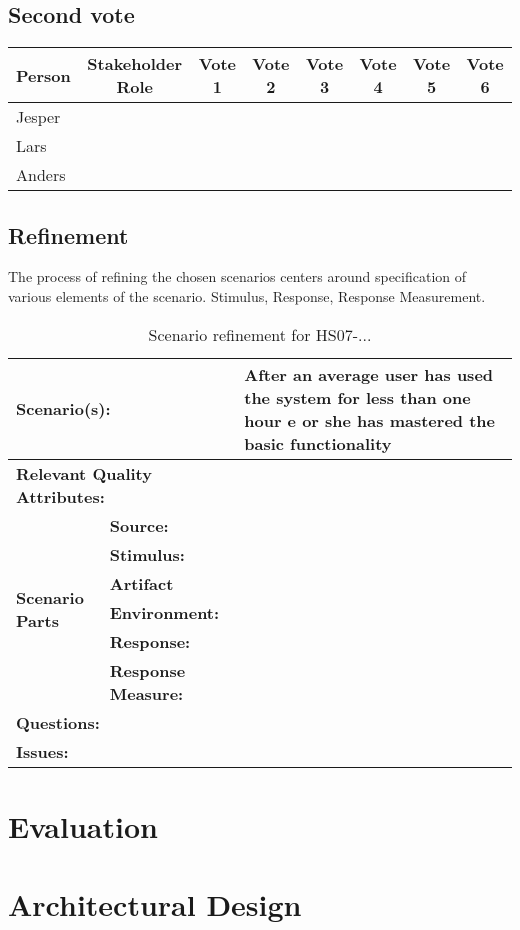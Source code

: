 \documentclass[a4paper,10pt]{article}
\begin{document}
\subsection{Second vote}
\begin{tabular}{|l|c|c|c|c|c|c|c|}
\hline
Person & Stakeholder Role & Vote 1 & Vote 2 & Vote 3 & Vote 4 & Vote 5 & Vote 6\\
\hline
Jesper& & & & & & & \\
Lars& & & & & & & \\
Anders& & & & & & & \\
\hline
\end{tabular}

\subsection{Refinement}
The process of refining the chosen scenarios centers around specification of various elements of the scenario. Stimulus, Response, Response Measurement. 
\begin{table}[!htp]
\begin{center}
\begin{tabular}{|p{0.3cm}|p{2.5cm}|p{8cm}|}
  \hline
  \multicolumn{2}{|p{3cm}|}{\bfseries Scenario(s):} & After an average user has used the system for less than one hour e or she has mastered the basic functionality \\
  \hline
  \multicolumn{2}{|p{3cm}|}{\bfseries Relevant Quality Attributes:} usability & \\
  \hline
  \multirow{6}{*}{\begin{sideways}{\bfseries Scenario Parts}\end{sideways}}
  & {\bfseries Source:} &  \\
  \cline{2-3}
  & {\bfseries Stimulus:} &  \\
  \cline{2-3}
  & {\bfseries Artifact} &  \\
  \cline{2-3}
  & {\bfseries Environment:} &  \\
  \cline{2-3}
  & {\bfseries Response:} &  \\
  \cline{2-3}
  & {\bfseries Response Measure:} & \\
  \hline
  \multicolumn{2}{|p{3cm}|}{\bfseries Questions:} &  \\
  \hline
  \multicolumn{2}{|p{3cm}|}{\bfseries Issues:} &  \\
  \hline
\end{tabular}
\caption{Scenario refinement for HS07-...}
\end{center}
\end{table}

\section{Evaluation}
\section{Architectural Design}


\end{document}
